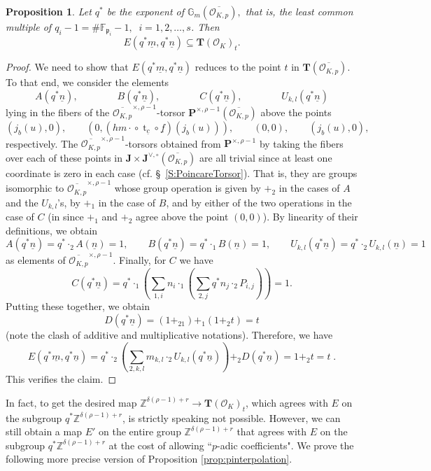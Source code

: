 \documentclass[11pt,oneside]{amsart}
\theoremstyle{plain}
\newtheorem{proposition}[theorem]{Proposition}
\theoremstyle{definition}
\def\G{{\bf G}}
\DeclareMathOperator{\tr}{t}
\def\TT{\mathbf{T}}
\def\Z{\mathbb{Z}}
\def\J{\mathbf{J}}
\def\Jo{\mathbf{J}^{\vee,\circ}}
\def\G{\mathbb{G}}
\def\P{\mathbf{P}}
\def\ra{\rightarrow}
\def\oh{\mathcal{O}}
\begin{document}
\begin{proposition}\label{prop:q-1-kills}
Let $q^*$ be the exponent of $\G_m(\overline{\oh_{K, p}}),$ that is, the least common multiple of $q_i-1=\# \mathbb{F}_{\mathfrak{p}_i}-1, \;\; i=1, 2, \dots, s$. Then 
$$E(q^*\underline{m}, q^*\underline{n})\subseteq \TT(\oh_K)_{t}.$$
\end{proposition}

\begin{proof}
We need to show that $E(q^*\underline{m}, q^*\underline{n})$ reduces to the point $t$ in $\TT(\overline{\oh_{K, p}})$. To that end, we consider the elements
$$A(q^*\underline{n}),
\qquad\qquad B(q^*\underline{n}),
\qquad\qquad C(q^*\underline{n}),
\qquad\qquad U_{k, l}(q^*\underline{n})$$
lying in the fibers of the $\overline{\oh_{K, p}}^{\times, \rho-1}$-torsor $\P^{\times, \rho-1}(\overline{\oh_{K, p}})$ above the points 
$$(j_b(u), 0),
\qquad(0, ({hm\cdot}\circ \tr_{\underline{c}}\circ \underline{f})(j_b(u))), 
\qquad (0, 0), 
\qquad (j_b(u), 0),$$
respectively. The $\overline{\oh_{K, p}}^{\times,\rho-1}$-torsors obtained from $\P^{\times, \rho-1}$ by taking the fibers over each of these points in $\J\times \Jo(\overline{\oh_{K, p}})$ are all trivial since at least one coordinate is zero in each case (cf. \S~\ref{S:PoincareTorsor}). That is, they are groups isomorphic to $\overline{\oh_{K, p}}^{\times, \rho-1}$ whose group operation is given by $+_2$ in the cases of $A$ and the $U_{k, l}$'s, by $+_1$ in the case of $B$, and by either of the two operations in the case of $C$ (in since $+_1$ and $+_2$ agree above the point $(0, 0)$). By linearity of their definitions, we obtain
$$A(q^*\underline{n})=q^{*}\cdot_2 A(\underline{n})=1,  \qquad B(q^*\underline{n})=q^{*}\cdot_1 B(\underline{n})=1, \qquad U_{k, l}(q^*\underline{n})=q^*\cdot_2U_{k, l}(\underline{n})=1 $$
as elements of $\overline{\oh_{K, p}}^{\times, \rho-1}.$ Finally, for $C$ we have
$$C(q^*\underline{n})=q^*\cdot_1\left({\sum}_{1, i}n_i \cdot_1 \left({\sum}_{2, j}q^*n_j\cdot_2 P_{i, j}\right)\right)=1.$$
Putting these together, we obtain
$$D(q^*\underline{n})=(1+_21)+_1(1+_2t)=t$$ 
(note the clash of additive and multiplicative notations). Therefore, we have
$$E(q^*\underline{m}, q^*\underline{n})=q^* \cdot_2\left({\sum}_{2, k, l}m_{k, l}\cdot_2U_{k, l}(q^*\underline{n})\right)+_2 D(q^*\underline{n})=1+_2t=t\;.$$ 
This verifies the claim.\end{proof}

In fact, to get the desired map $\Z^{\delta(\rho - 1)+ r} \ra \TT(\oh_K)_t$, which agrees with $E$ on the subgroup $q^* \Z^{\delta(\rho - 1)+ r}$, is strictly speaking not possible. However, we  can still obtain a map $E'$ on the entire group $\Z^{\delta(\rho-1)+r}$ that agrees with $E$ on the subgroup $q^* \Z^{\delta(\rho - 1)+ r}$ at the cost of allowing ``$p$-adic coefficients". We prove the following more precise version of Proposition \ref{prop:pinterpolation}. 
\end{document}
